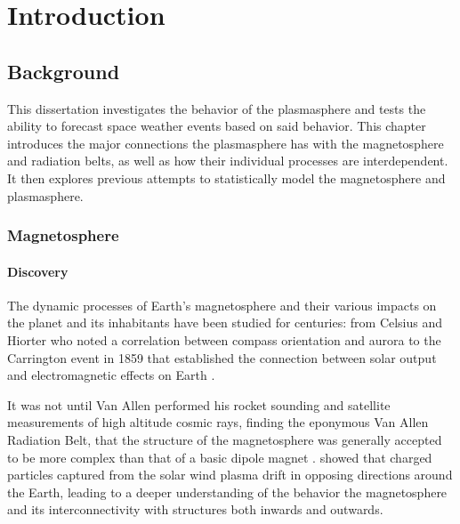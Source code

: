 
\chapter[Introduction]{Introduction}

\section{Background}

This dissertation investigates the behavior of the plasmasphere and tests the ability to forecast space weather events based on said behavior. This chapter introduces the major connections the plasmasphere has with the magnetosphere and radiation belts, as well as how their individual processes are interdependent.  It then explores previous attempts to statistically model the magnetosphere and plasmasphere.

\subsection{Magnetosphere}

\subsubsection{Discovery}
The dynamic processes of Earth's magnetosphere and their various impacts on the planet and its inhabitants have been studied for centuries: from Celsius and Hiorter who noted a correlation between compass orientation and aurora \citep{Maunder} to the Carrington event in 1859 that established the connection between solar output and electromagnetic effects on Earth \citep{Carrington}. 

It was not until Van Allen performed his rocket sounding and satellite measurements of high altitude cosmic rays, finding the eponymous Van Allen Radiation Belt, that the structure of the magnetosphere was generally accepted to be more complex than that of a basic dipole magnet \citep{MagnetoHistory}. \cite{Gold1959RingCurrent} showed that charged particles captured from the solar wind plasma drift in opposing directions around the Earth, leading to a deeper understanding of the behavior the magnetosphere and its interconnectivity with structures both inwards and outwards.

